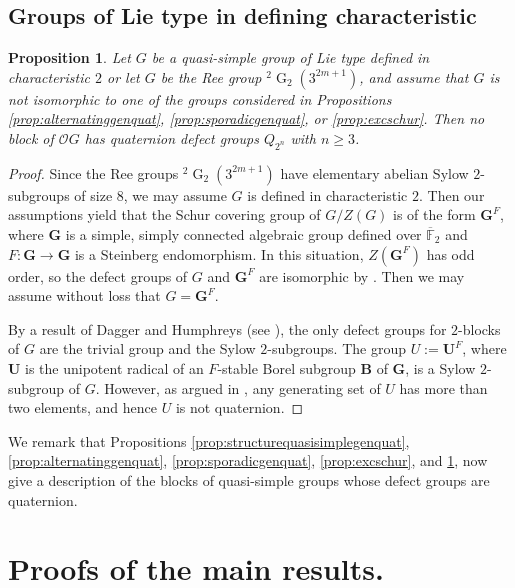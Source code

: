 \documentclass{amsart}
\theoremstyle{plain}\newtheorem{Theorem}{Theorem}[section]
\theoremstyle{plain}\newtheorem{Conjecture}[Theorem]{Conjecture}
\theoremstyle{plain}\newtheorem{Corollary}[Theorem]{Corollary}
\theoremstyle{plain}\newtheorem{Lemma}[Theorem]{Lemma}
\theoremstyle{plain}\newtheorem{Proposition}[Theorem]{Proposition}
\theoremstyle{definition}\newtheorem{Definition}[Theorem]{Definition}
\theoremstyle{definition}\newtheorem{Example}[Theorem]{Example}
\theoremstyle{definition}\newtheorem{Examples}[Theorem]{Examples}
\theoremstyle{definition}\newtheorem{Exercise}[Theorem]{Exercise}
\theoremstyle{definition}\newtheorem{Notation}[Theorem]{Notation}
\theoremstyle{definition}\newtheorem{Remark}[Theorem]{Remark}
\theoremstyle{definition}\newtheorem{Remarks}[Theorem]{Remarks}
\def\CO{{\mathcal{O}}}    \def\OPE{{\mathcal{O}(P\rtimes E)}}
\newcommand{\bG}{{\mathbf{G}}}
\newcommand{\type}{\operatorname}
\newcommand{\tw}[1]{{}^#1\!}
\newcommand{\tG}{\type{G}}
\newcommand{\zent} {Z}
\numberwithin{equation}{section}
\begin{document}
\subsection{Groups of Lie type in defining characteristic} \label{sec:defining}
 \begin{Proposition}
     \label{prop:defchar}
Let $G$ be a quasi-simple group of Lie type defined in characteristic $2$ or let $G$ be the Ree group $\tw{2}\tG_2(3^{2m+1})$, and assume that $G$ is not isomorphic to one of the groups considered in Propositions \ref{prop:alternatinggenquat}, \ref{prop:sporadicgenquat},  or \ref{prop:excschur}. Then no block of $\CO G$ has quaternion defect groups $Q_{2^n}$ with $n\geq 3$. 
 \end{Proposition}
 \begin{proof}
 Since the Ree groups $\tw{2}\tG_2(3^{2m+1})$ have elementary abelian Sylow $2$-subgroups of size $8$, we may assume $G$ is defined in characteristic $2$. Then our assumptions yield that the Schur covering group of $G/\zent(G)$ is of the form $\bG^F$, where $\bG$ is a simple, simply connected algebraic group defined over $\overline{\mathbb{F}}_2$ and $F\colon \bG\rightarrow\bG$ is a Steinberg endomorphism. In this situation, $\zent(\bG^F)$ has odd order, so the defect groups of $G$ and $\bG^F$ are isomorphic by \cite[Thm.~9.9(c)]{N98}. Then we may assume without loss that $G=\bG^F$. 
 
 By a result of Dagger and Humphreys (see \cite{humphreys}), the only defect groups for $2$-blocks of $G$ are the trivial group and the Sylow $2$-subgroups. The group $U:=\mathbf{U}^F$, where $\mathbf{U}$ is the unipotent radical of an $F$-stable Borel subgroup $\mathbf{B}$ of $\bG$, is a Sylow $2$-subgroup of $G$. However, as argued in \cite[Prop.~4.9]{NRSV}, any generating set of $U$ has more than two elements, and hence $U$ is not quaternion.
\end{proof}
 

We remark that Propositions \ref{prop:structurequasisimplegenquat}, \ref{prop:alternatinggenquat},
  \ref{prop:sporadicgenquat},  \ref{prop:excschur}, and \ref{prop:defchar}, now give a description of the blocks of quasi-simple groups whose defect groups are quaternion.


\section{Proofs of the main results.}\label{sec:mainproofs}
\end{document}
